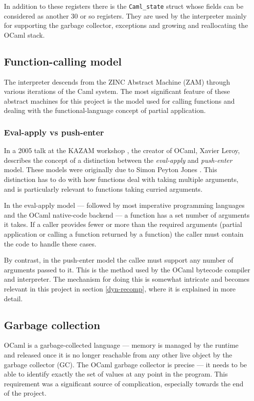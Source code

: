 In addition to these registers there is the \texttt{Caml\_state} struct whose fields can be
considered as another 30 or so registers. They are used by the interpreter mainly for supporting
the garbage collector, exceptions and growing and reallocating the OCaml stack.

\subsection{Function-calling model}

The interpreter descends from the ZINC Abstract Machine (ZAM) \cite{zinc} through various
iterations of the Caml system. The most significant feature of these abstract machines for this
project is the model used for calling functions and dealing with the functional-language concept
of partial application.

\subsubsection{Eval-apply vs push-enter}

In a 2005 talk at the KAZAM workshop \cite{xavtalk}, the creator of OCaml, Xavier Leroy, describes
the concept of a distinction between the \emph{eval-apply} and \emph{push-enter} model.
These models were originally due to Simon Peyton Jones \cite{jones}\cite{marlow-jones}. This
distinction has to do with how functions deal with taking multiple arguments, and is particularly
relevant to functions taking curried arguments.

In the eval-apply model --- followed by most imperative programming languages and the OCaml
native-code backend --- a function has a set number of arguments it takes. If a caller provides
fewer or more than the required arguments (partial application or calling a function returned by a
function) the caller must contain the code to handle these cases.

By contrast, in the push-enter model the callee must support any number of arguments passed to it.
This is the method used by the OCaml bytecode compiler and interpreter. The mechanism for doing
this is somewhat intricate and becomes relevant in this project in section \ref{dyn-recomp}, where
it is explained in more detail.

\subsection{Garbage collection}

OCaml is a garbage-collected language --- memory is managed by the runtime and released once it is
no longer reachable from any other live object by the garbage collector (GC). The OCaml garbage
collector is precise --- it needs to be able to identify exactly the set of values at any point in
the program. This requirement was a significant source of complication, especially towards the end
of the project.

